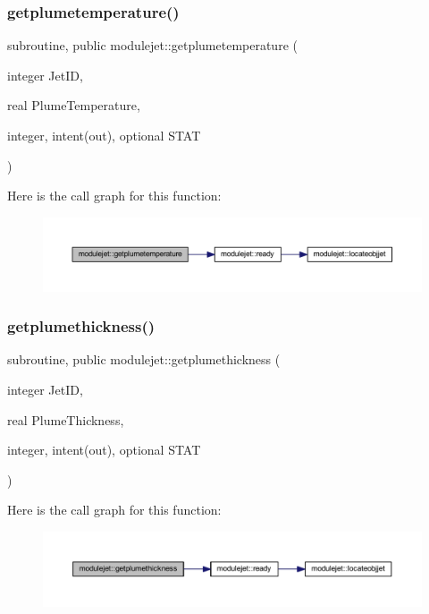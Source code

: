 \subsubsection{\texorpdfstring{getplumetemperature()}{getplumetemperature()}}
{\footnotesize\ttfamily subroutine, public modulejet\+::getplumetemperature (\begin{DoxyParamCaption}\item[{integer}]{Jet\+ID,  }\item[{real}]{Plume\+Temperature,  }\item[{integer, intent(out), optional}]{S\+T\+AT }\end{DoxyParamCaption})}

Here is the call graph for this function\+:\nopagebreak
\begin{figure}[H]
\begin{center}
\leavevmode
\includegraphics[width=350pt]{namespacemodulejet_aa64ddb0bd7c80f966b8ec54eb9a36c7c_cgraph}
\end{center}
\end{figure}
\mbox{\label{namespacemodulejet_a50ced2ba527ab243cd3228d18867695d}} 
\subsubsection{\texorpdfstring{getplumethickness()}{getplumethickness()}}
{\footnotesize\ttfamily subroutine, public modulejet\+::getplumethickness (\begin{DoxyParamCaption}\item[{integer}]{Jet\+ID,  }\item[{real}]{Plume\+Thickness,  }\item[{integer, intent(out), optional}]{S\+T\+AT }\end{DoxyParamCaption})}

Here is the call graph for this function\+:\nopagebreak
\begin{figure}[H]
\begin{center}
\leavevmode
\includegraphics[width=350pt]{namespacemodulejet_a50ced2ba527ab243cd3228d18867695d_cgraph}
\end{center}
\end{figure}
\mbox{\label{namespacemodulejet_ab7e7ab36f584f4edd9e7f7835d1e0cee}} 
